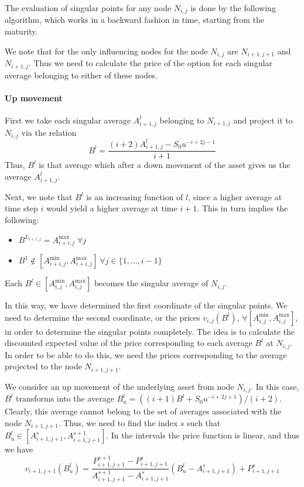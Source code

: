 The evaluation of singular points for any node $ N_{i,j} $ is done by the following algorithm, which works in a backward fashion in time, starting from the maturity.

We note that for the only influencing nodes for the node $ N_{i,j} $ are $ N_{i+1,j+1} $ and $ N_{i+1,j} $. Thus we need to calculate the price of the option for each singular average belonging to either of these nodes.


\paragraph{Up movement}

First we take each singular average $ A_{i+1,j}^l $ belonging to $ N_{i+1,j} $ and project it to $ N_{i,j} $ via the relation
\begin{equation}
	\label{eq:asian-proj-up}
	B^l = \frac{ ( i+2) A_{i+1,j}^l - S_0 u^{-i+2j-1} }{ i+1 }
\end{equation}
Thus, $ B^l $ is that average which after a down movement of the asset gives us the average $ A_{i+1,j}^l $.

Next, we note that $ B^l $ is an increasing function of $ l $, since a higher average at time step $ i $ would yield a higher average at time $ i+1 $. This in turn implies the following:
\begin{itemize}
\item $ B^{L_{i+1,j}} = A_{i+i,j}^{\max} \; \forall j $
\item $ B^1 \notin \left[ A_{i+i,j}^{\min}, A_{i+i,j}^{\max} \right] \ \forall j \in \{1, \dots, i-1 \} $
\end{itemize}
Each $ B^l \in \left[ A_{i,j}^{\min}, A_{i,j}^{\max} \right] $ becomes the singular average of $ N_{i,j} $.

In this way, we have determined the first coordinate of the singular points. We need to determine the second coordinate, or the prices $ v_{i,j}(B^l) $, $ \forall \left[ A_{i,j}^{\min}, A_{i,j}^{\max} \right] $, in order to determine the singular points completely. The idea is to calculate the discounted expected value of the price corresponding to each average $ B^l $ at $ N_{i,j} $. In order to be able to do this, we need the prices corresponding to the average projected to the node $ N_{i+1,j+1} $.

We consider an up movement of the underlying asset from node $ N_{i,j} $. In this case, $ B^l $ transforms into the average $ B^l_u = \left( (i+1) B^l + S_0 u^{-i+2j+1} \right) / ( i+2 ) $. Clearly, this average cannot belong to the set of averages associated with the node $ N_{i+1,j+1} $. Thus, we need to find the index $s$ such that $ B^l_u \in \left[ A_{i+1,j+1}^{s} , A_{i+1,j+1}^{s+1} \right] $. In the intervals the price function is linear, and thus we have
\begin{equation}
	\label{eq:asian-up-lint}
	v_{i+1,j+1} \left( B^l_u \right) = \frac{ P_{i+1,j+1}^{s+1} - P_{i+1,j+1}^{s} }{ A_{i+1,j+1}^{s+1} - A_{i+1,j+1}^{s} } \left( B^l_u - A_{i+1,j+1}^{s} \right) + P_{i+1,j+1}^{s}
\end{equation}

